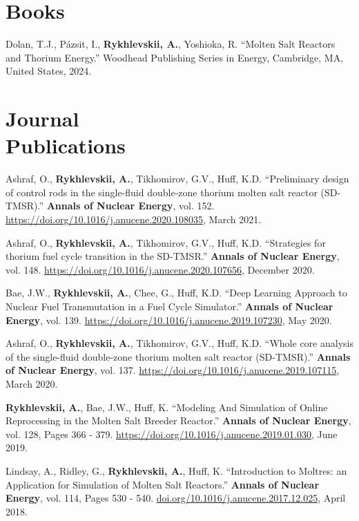 \documentclass[margin,line]{resume}
\begin{document}
\begin{resume}
	\section{\mysidestyle Books}
	\begin{bibenum}
		\item Dolan, T.J., Pázsit, I., \textbf{Rykhlevskii, A.}, Yoshioka, R.
		``Molten Salt Reactors and Thorium Energy.'' Woodhead Publishing Series in Energy, Cambridge, MA,    	United States, 2024.
	\end{bibenum}
    \section{\mysidestyle Journal\\Publications}
      \begin{bibenum}
        \item Ashraf, O., \textbf{Rykhlevskii, A.}, Tikhomirov, G.V., Huff, 
      	K.D. ``Preliminary design of control rods in the single-fluid 
      	double-zone thorium molten salt reactor (SD-TMSR).''
      	\textbf{Annals of Nuclear Energy}, vol. 152. 
      	\url{https://doi.org/10.1016/j.anucene.2020.108035}, March 
      	2021.  	
	    \item Ashraf, O., \textbf{Rykhlevskii, A.}, Tikhomirov, G.V., Huff, 
		K.D. ``Strategies for thorium fuel cycle transition in the SD-TMSR.''
		\textbf{Annals of Nuclear Energy}, vol. 148. 
		\url{https://doi.org/10.1016/j.anucene.2020.107656}, December 
		2020.   	
 		\item Bae, J.W., \textbf{Rykhlevskii, A.}, Chee, G., Huff, K.D. ``Deep 
		 Learning Approach to Nuclear Fuel Transmutation in a Fuel Cycle 
		 Simulator.'' \textbf{Annals of Nuclear Energy}, vol. 139. 
		 \url{https://doi.org/10.1016/j.anucene.2019.107230}, May 2020.
	    \item Ashraf, O., \textbf{Rykhlevskii, A.}, Tikhomirov, G.V., Huff, 
		K.D. ``Whole core analysis of the single-fluid double-zone thorium 
		molten salt reactor (SD-TMSR).'' \textbf{Annals of Nuclear Energy}, 
		vol. 137. \url{https://doi.org/10.1016/j.anucene.2019.107115}, March 
		2020.
	    \item \textbf{Rykhlevskii, A.}, Bae, J.W., Huff, K. ``Modeling And 
	    Simulation of Online Reprocessing in the Molten Salt Breeder 
	    Reactor.'' \textbf{Annals of Nuclear Energy}, vol. 128, Pages 366 - 
	    379. \url{https://doi.org/10.1016/j.anucene.2019.01.030}, June 2019.
       \item Lindsay, A., Ridley, G., \textbf{Rykhlevskii, A.}, Huff, K. ``Introduction to 
               Moltres: an Application for Simulation of Molten Salt 
               Reactors.''  \textbf{Annals of Nuclear Energy}, vol. 114, Pages 
               530 - 540. \url{doi.org/10.1016/j.anucene.2017.12.025}, April 
               2018.
      \end{bibenum}
\vspace{2mm} %

\end{resume}
\end{document}
